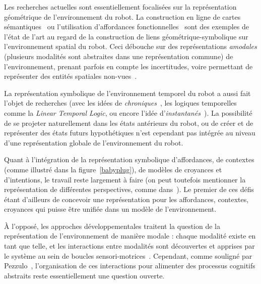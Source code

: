 \documentclass[a4paper]{article}
\begin{document}
Les recherches actuelles sont essentiellement focalisées sur la représentation
géométrique de l'environnement du robot. La construction en ligne de cartes
sémantiques~\cite{Nuechter2008, Galindo2008, Blodow2011} ou l'utilisation
d'affordances fonctionnelles~\cite{Varadarajan2011} sont des exemples de l'état
de l'art au regard de la construction de liens géométrique-symbolique sur
l'environnement spatial du robot. Ceci débouche sur des représentations
\emph{amodales} (plusieurs modalités sont abstraites dans une représentation
commune) de l'environnement, prenant parfois en compte les incertitudes, voire
permettant de représenter des entités spatiales non-vues~\cite{Mavridis2006}.

La représentation symbolique de l'environnement temporel du robot a aussi fait
l'objet de recherches (avec les idées de \emph{chroniques}~\cite{Ghallab1996},
les logiques temporelles comme la \emph{Linear Temporal Logic}, ou encore
l'idée d'\emph{instantanés}~\cite{Mavridis2006}).  La possibilité de se projeter
naturellement dans les états antérieurs du robot, ou de créer et de représenter
des états futurs hypothétiques n'est cependant pas intégrée au niveau d'une
représentation globale de l'environnement du robot.

Quant à l'intégration de la représentation symbolique d'affordances, de
contextes (comme illustré dans la figure~\ref{babyplug}), de modèles de
croyances et d'intentions, le travail reste largement à faire (on peut toutefois
mentionner la représentation de différentes perspectives, comme
dans~\cite{ros2010which}). Le premier de ces défis étant d'ailleurs de concevoir
une représentation pour les affordances, contextes, croyances qui
puisse être unifiée dans un modèle de l'environnement.

À l'opposé, les approches développementales traitent la question de la
représentation de l'environnement de manière modale : chaque modalité existe en
tant que telle, et les interactions entre modalités sont découvertes et apprises
par le système au sein de boucles sensori-motrices~\cite{morse2010epigenetic,
mihoub2014modeling}. Cependant, comme souligné
par Pezzulo~\cite{pezzulo2012computational}, l'organisation de ces interactions
pour alimenter des processus cognitifs abstraits reste essentiellement une
question ouverte.
\end{document}
